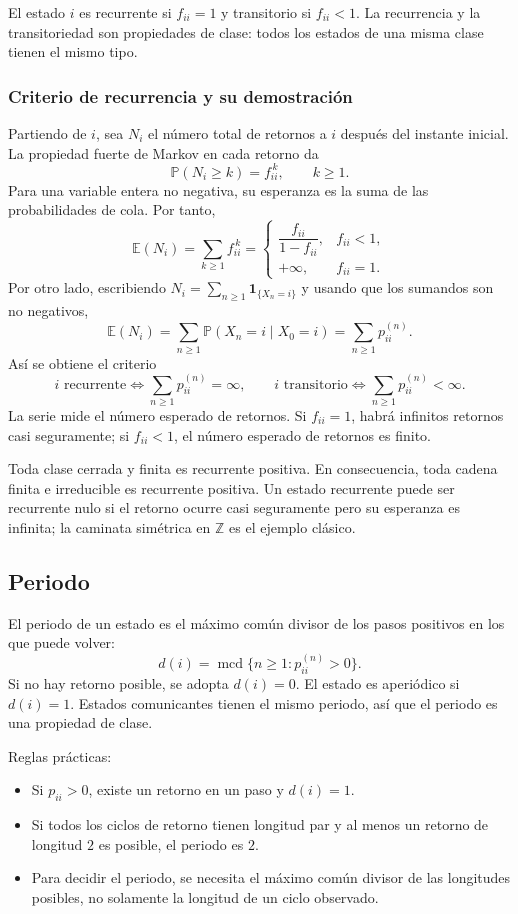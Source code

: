 \documentclass[11pt,oneside]{article}
\newcommand{\E}{\mathbb{E}}
\newcommand{\Prob}{\mathbb{P}}
\newcommand{\1}{\mathbf{1}}
\newcommand{\mcd}{\operatorname{mcd}}
\begin{document}
El estado $i$ es recurrente si $f_{ii}=1$ y transitorio si $f_{ii}<1$. La recurrencia y la transitoriedad son propiedades de clase: todos los estados de una misma clase tienen el mismo tipo.

\subsubsection*{Criterio de recurrencia y su demostración}

Partiendo de $i$, sea $N_i$ el número total de retornos a $i$ después del instante inicial. La propiedad fuerte de Markov en cada retorno da
\[
\Prob(N_i\geq k)=f_{ii}^{\,k},\qquad k\geq 1.
\]
Para una variable entera no negativa, su esperanza es la suma de las probabilidades de cola. Por tanto,
\[
\E(N_i)=\sum_{k\geq 1}f_{ii}^{\,k}
 =\begin{cases}
 \dfrac{f_{ii}}{1-f_{ii}},&f_{ii}<1,\\[0.6em]
 +\infty,&f_{ii}=1.
 \end{cases}
\]
Por otro lado, escribiendo $N_i=\sum_{n\geq 1}\1_{\{X_n=i\}}$ y usando que los sumandos son no negativos,
\[
\E(N_i)=\sum_{n\geq 1}\Prob(X_n=i\mid X_0=i)
        =\sum_{n\geq 1}p_{ii}^{(n)}.
\]
Así se obtiene el criterio
\[
\boxed{\ i\text{ recurrente}\iff\sum_{n\geq 1}p_{ii}^{(n)}=\infty,
\qquad i\text{ transitorio}\iff\sum_{n\geq 1}p_{ii}^{(n)}<\infty.\ }
\]
La serie mide el número esperado de retornos. Si $f_{ii}=1$, habrá infinitos retornos casi seguramente; si $f_{ii}<1$, el número esperado de retornos es finito.

Toda clase cerrada y finita es recurrente positiva. En consecuencia, toda cadena finita e irreducible es recurrente positiva. Un estado recurrente puede ser recurrente nulo si el retorno ocurre casi seguramente pero su esperanza es infinita; la caminata simétrica en $\mathbb Z$ es el ejemplo clásico.

\subsection{Periodo}

El periodo de un estado es el máximo común divisor de los pasos positivos en los que puede volver:
\[
d(i)=\mcd\{n\geq 1:p_{ii}^{(n)}>0\}.
\]
Si no hay retorno posible, se adopta $d(i)=0$. El estado es aperiódico si $d(i)=1$. Estados comunicantes tienen el mismo periodo, así que el periodo es una propiedad de clase.

Reglas prácticas:
\begin{itemize}
  \item Si $p_{ii}>0$, existe un retorno en un paso y $d(i)=1$.
  \item Si todos los ciclos de retorno tienen longitud par y al menos un retorno de longitud $2$ es posible, el periodo es $2$.
  \item Para decidir el periodo, se necesita el máximo común divisor de las longitudes posibles, no solamente la longitud de un ciclo observado.
\end{itemize}
\end{document}
